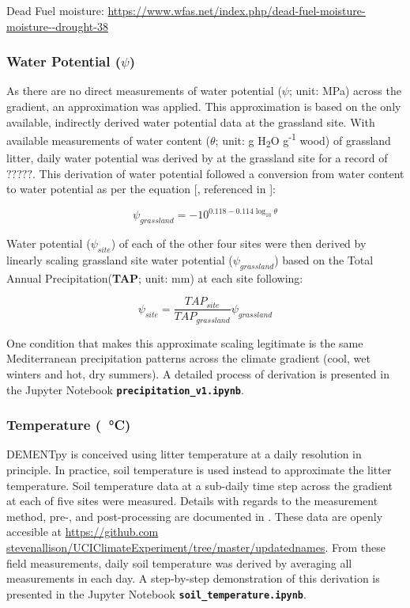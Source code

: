 \documentclass[letterpaper, 10pt]{article}
\begin{document}
Dead Fuel moisture: \url{https://www.wfas.net/index.php/dead-fuel-moisture-moisture--drought-38}

\subsubsection{Water Potential ($\psi$)}
As there are no direct measurements of water potential ($\psi$; unit: MPa) across the gradient, an approximation was applied. This approximation is based on the only available, indirectly derived water potential data at the grassland site. With available measurements of water content ($\theta$; unit: g H\textsubscript{2}O g\textsuperscript{-1} wood) of grassland litter, daily water potential was derived by \citet{allison2017consequences} at the grassland site for a record of $?????$. This derivation of water potential followed a conversion from water content to water potential as per the equation [\citet{dix1985changes}, referenced in \citet{allison2017consequences}]:

\begin{equation}
  \psi_{grassland} = -10^{0.118-0.114\log_{10} \theta}
\end{equation}

Water potential ($\psi_{site}$) of each of the other four sites were then derived by linearly scaling grassland site water potential ($\psi_{grassland}$) based on the Total Annual Precipitation(\textbf{TAP}; unit: mm) at each site following:

\begin{equation}
  \psi_{site} = \frac{TAP_{site}}{TAP_{grassland}} \psi_{grassland}
\end{equation}

One condition that makes this approximate scaling legitimate is the same Mediterranean precipitation patterns across the climate gradient (cool, wet winters and hot, dry summers). A detailed process of derivation is presented in the Jupyter Notebook \textbf{\texttt{precipitation\_v1.ipynb}}.


\subsubsection{Temperature (\SI{}{\celsius})}
DEMENTpy is conceived using litter temperature at a daily resolution in principle. In practice, soil temperature is
used instead to approximate the litter temperature. Soil temperature data at a sub-daily time step across the gradient
at each of five sites were measured. Details with regards to the measurement method, pre-, and post-processing are
documented in \citet{glassman2018decomposition}. These data are openly accesible at \url{https://github.com
stevenallison/UCIClimateExperiment/tree/master/updatednames}. From these field measurements, daily soil
temperature was derived by averaging all measurements in each day. A step-by-step demonstration of this derivation
is presented in the Jupyter Notebook \textbf{\texttt{soil\_temperature.ipynb}}.
\end{document}
